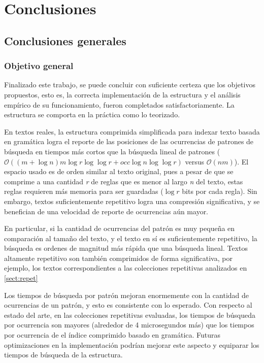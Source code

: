 \chapter{Conclusiones}
\section{Conclusiones generales}
\subsection{Objetivo general}
Finalizado este trabajo, se puede concluir con suficiente certeza que los objetivos propuestos, esto es, la correcta implementación de la estructura y el análisis empírico de su funcionamiento, fueron completados satisfactoriamente. La estructura se comporta en la práctica como lo teorizado.

En textos reales, la estructura comprimida simplificada para indexar texto basada en gramática logra el reporte de las posiciones de las ocurrencias de patrones de búsqueda en tiempos más cortos que la búsqueda lineal de patrones ($\mathcal{O}( (m + \log{n}) m \log{r} \log{\log{r}} + \textit{occ} \log{n} \log{\log{r}}  )$ versus $\mathcal{O}(n m)$). El espacio usado es de orden similar al texto original, pues a pesar de que se comprime a una cantidad \textit{r} de reglas que es menor al largo \textit{n} del texto, estas reglas requieren más memoria para ser guardadas ($\log r$ bits por cada regla). Sin embargo, textos suficientemente repetitivo logra una compresión significativa, y se benefician de una velocidad de reporte de ocurrencias aún mayor.

En particular, si la cantidad de ocurrencias del patrón es muy pequeña en comparación al tamaño del texto, y el texto en sí es suficientemente repetitivo, la búsqueda es ordenes de magnitud más rápida que una búsqueda lineal. Textos altamente repetitivo son también comprimidos de forma significativa, por ejemplo, los textos correspondientes a las colecciones repetitivas analizados en \ref{sect:repet}

Los tiempos de búsqueda por patrón mejoran enormemente con la cantidad de ocurrencias de un patrón, y esto es consistente con lo esperado. Con respecto al estado del arte, en las colecciones repetitivas evaluadas, los tiempos de búsqueda por ocurrencia son mayores (alrededor de 4 microsegundos más) que los tiempos por ocurrencia de el índice comprimido basado en gramática\cite{claude2020}. Futuras optimizaciones en la implementación podrían mejorar este aspecto y equiparar los tiempos de búsqueda de la estructura.

